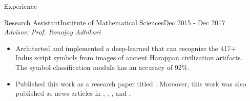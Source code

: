 \documentclass[]{mcdowellcv}
\begin{document}
\begin{cvsection}{Experience}
		\begin{cvsubsection}{Research Assistant}{Institute of Mathematical Sciences}{Dec 2015 - Dec 2017}
		    \textit{\href{https://github.com/tpsatish95/indus-script-ocr}{{\color{blue!70}{Optical Character Recognition on Indus Scripts}}}} \hfill \textit{Advisor: Prof. Ronojoy Adhikari}
			\begin{itemize}
				\item Architected and implemented a deep-learned \href{https://www.youtube.com/watch?v=qPF1oR9yMNY}{} that can recognize the 417+ Indus script symbols from images of ancient Harappan civilization artifacts. The symbol classification module has an accuracy of 92\%.%
				\item Published this work as a research paper titled \href{https://arxiv.org/pdf/1702.00523.pdf}{}. Moreover, this work was also published as news articles in \href{https://www.theverge.com/2017/1/25/14371450/indus-valley-civilization-ancient-seals-symbols-language-algorithms-ai\#EQQA6r}{{}}, \href{http://www.thehindu.com/sci-tech/science/chennai-team-taps-ai-to-read-indus-script/article17448690.ece}{{}}, \href{http://timesofindia.indiatimes.com/city/chennai/app-may-help-decipher-indus-valley-symbols/articleshow/57281369.cms}{{}}, and \href{http://www.sbs.com.au/yourlanguage/tamil/en/content/app-decipher-ancient-symbols?language=en}{{}}.
			\end{itemize}
		\end{cvsubsection}


\end{cvsection}
\end{document}
